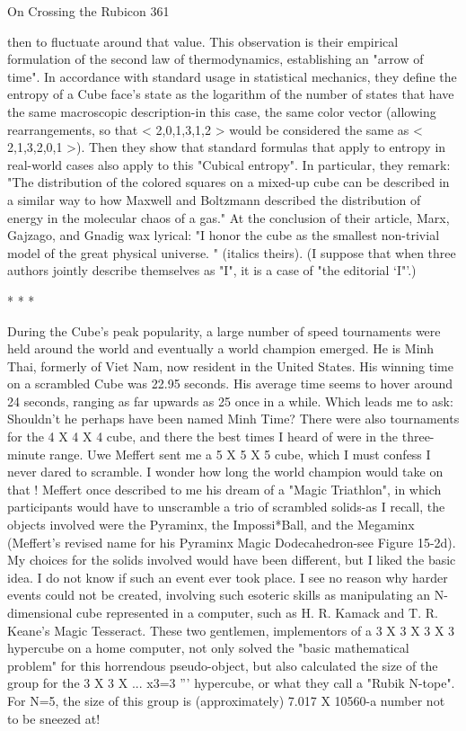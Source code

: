 On Crossing the Rubicon                                                              361

then to fluctuate around that value. This observation is their empirical formulation
of the second law of thermodynamics, establishing an "arrow of time".
        In accordance with standard usage in statistical mechanics, they define the
        entropy of a Cube face's state as the logarithm of the number of states that
have the same macroscopic description-in this case, the same color vector
(allowing rearrangements, so that < 2,0,1,3,1,2 > would be considered the same as
< 2,1,3,2,0,1 >). Then they show that standard formulas that apply to entropy in
real-world cases also apply to this "Cubical entropy". In particular, they remark:
"The distribution of the colored squares on a mixed-up cube can be described in a
similar way to how Maxwell and Boltzmann described the distribution of energy in
the molecular chaos of a gas." At the conclusion of their article, Marx, Gajzago,
and Gnadig wax lyrical: "I honor the cube as the smallest non-trivial model of the
great physical universe. " (italics theirs). (I suppose that when three authors jointly
describe themselves as "I", it is a case of "the editorial `I"'.)

                                   *      *       *

        During the Cube's peak popularity, a large number of speed tournaments
were held around the world and eventually a world champion emerged. He is Minh
Thai, formerly of Viet Nam, now resident in the United States. His winning time
on a scrambled Cube was 22.95 seconds. His average time seems to hover around
24 seconds, ranging as far upwards as 25 once in a while. Which leads me to ask:
Shouldn't he perhaps have been named Minh Time?
        There were also tournaments for the 4 X 4 X 4 cube, and there the best
times I heard of were in the three-minute range. Uwe Meffert sent me a 5 X 5 X 5
cube, which I must confess I never dared to scramble. I wonder how long the world
champion would take on that ! Meffert once described to me his dream of a "Magic
Triathlon", in which participants would have to unscramble a trio of scrambled
solids-as I recall, the objects involved were the Pyraminx, the Impossi*Ball, and
the Megaminx (Meffert's revised name for his Pyraminx Magic Dodecahedron-see
Figure 15-2d). My choices for the solids involved would have been different, but I
liked the basic idea. I do not know if such an event ever took place.
        I see no reason why harder events could not be created, involving such
esoteric skills as manipulating an N-dimensional cube represented in a computer,
such as H. R. Kamack and T. R. Keane's Magic Tesseract. These two gentlemen,
implementors of a 3 X 3 X 3 X 3 hypercube on a home computer, not only solved
the "basic mathematical problem" for this horrendous pseudo-object, but also
calculated the size of the group for the 3 X 3 X ... x3=3 ''' hypercube, or what they
call a "Rubik N-tope". For N=5, the size of this group is (approximately) 7.017 X
10560-a number not to be sneezed at!




